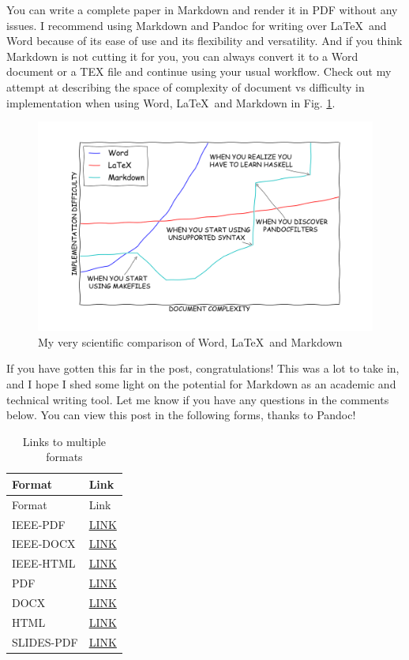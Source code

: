 \documentclass[journal,10pt,final]{IEEEtran}
\begin{document}
You can write a complete paper in Markdown and render it in PDF without
any issues. I recommend using Markdown and Pandoc for writing over
\LaTeX~and Word because of its ease of use and its flexibility and
versatility. And if you think Markdown is not cutting it for you, you
can always convert it to a Word document or a TEX file and continue
using your usual workflow. Check out my attempt at describing the space
of complexity of document vs difficulty in implementation when using
Word, \LaTeX~and Markdown in Fig. \ref{fig:learningcurve}.

\begin{figure}[htbp]
\centering
\includegraphics{../images/learningcurve.png}
\caption{My very scientific comparison of Word, \LaTeX~and
Markdown\label{fig:learningcurve}}
\end{figure}

If you have gotten this far in the post, congratulations! This was a lot
to take in, and I hope I shed some light on the potential for Markdown
as an academic and technical writing tool. Let me know if you have any
questions in the comments below. You can view this post in the following
forms, thanks to Pandoc!

\begin{longtable}[c]{@{}ll@{}}
\caption{Links to multiple formats}\tabularnewline
\toprule
Format & Link\tabularnewline
\midrule
\endfirsthead
\toprule
Format & Link\tabularnewline
\midrule
\endhead
IEEE-PDF &
\href{http://kdheepak.com/downloads/writing-papers-with-markdown.ieee.pdf}{LINK}\tabularnewline
IEEE-DOCX &
\href{http://kdheepak.com/downloads/writing-papers-with-markdown.ieee.docx}{LINK}\tabularnewline
IEEE-HTML &
\href{http://kdheepak.com/downloads/writing-papers-with-markdown.ieee.html}{LINK}\tabularnewline
PDF &
\href{http://kdheepak.com/downloads/writing-papers-with-markdown.pdf}{LINK}\tabularnewline
DOCX &
\href{http://kdheepak.com/downloads/writing-papers-with-markdown.docx}{LINK}\tabularnewline
HTML &
\href{http://kdheepak.com/downloads/writing-papers-with-markdown.html}{LINK}\tabularnewline
SLIDES-PDF &
\href{http://kdheepak.com/downloads/writing-papers-with-markdown.slides.pdf}{LINK}\tabularnewline
\bottomrule
\end{longtable}
\end{document}
